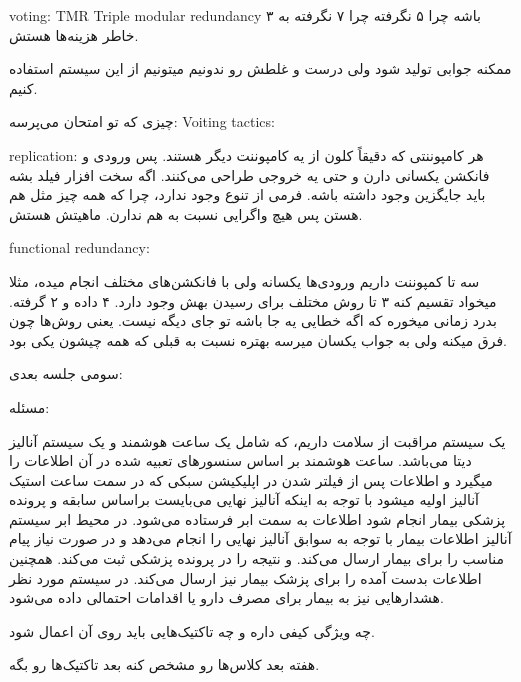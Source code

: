 voting: TMR Triple modular redundancy ۳ باشه چرا ۵ نگرفته چرا ۷ نگرفته به خاطر
هزینه‌ها هستش.

ممکنه جوابی تولید شود ولی درست و غلطش رو ندونیم میتونیم از این سیستم استفاده
کنیم. 

چیزی که تو امتحان می‌پرسه:
Voiting tactics:

replication: هر کامپوننتی که دقیقاً کلون از یه کامپوننت دیگر هستند. پس ورودی و
فانکشن یکسانی دارن و حتی یه خروجی طراحی می‌کنند. اگه سخت افزار فیلد بشه باید
جایگزین وجود داشته باشه. فرمی از تنوع وجود ندارد، چرا که همه چیز مثل هم هستن پس
هیچ واگرایی نسبت به هم ندارن. ماهیتش هستش.

functional redundancy:

سه تا کمپوننت داریم ورودی‌ها یکسانه ولی با فانکشن‌های مختلف انجام میده، مثلا
میخواد تقسیم کنه ۳ تا روش مختلف برای رسیدن بهش وجود دارد. ۴ داده و ۲ گرفته. بدرد
زمانی میخوره که اگه خطایی یه جا باشه تو جای دیگه نیست. یعنی روش‌ها چون فرق میکنه
ولی به جواب یکسان میرسه بهتره نسبت به قبلی که همه چیشون یکی بود.

سومی جلسه بعدی:

مسئله:

یک سیستم مراقبت از سلامت داریم، که شامل یک ساعت هوشمند و یک سیستم آنالیز دیتا
می‌باشد. ساعت هوشمند بر اساس سنسور‌های تعبیه شده در آن اطلاعات را میگیرد و
اطلاعات پس از فیلتر شدن در اپلیکیشن سبکی که در سمت ساعت استیک آنالیز اولیه میشود
با توجه به اینکه آنالیز نهایی می‌بایست براساس سابقه و پرونده پزشکی بیمار انجام
شود اطلاعات به سمت ابر فرستاده می‌شود. در محیط ابر سیستم آنالیز اطلاعات بیمار با
توجه به سوابق آنالیز نهایی را انجام می‌دهد و در صورت نیاز پیام مناسب را برای
بیمار ارسال می‌کند. و نتیجه را در پرونده پزشکی ثبت می‌کند. همچنین اطلاعات بدست
آمده را برای پزشک بیمار نیز ارسال می‌کند. در سیستم مورد نظر هشدار‌هایی نیز به
بیمار برای مصرف دارو یا اقدامات احتمالی داده می‌شود.

چه ویژگی کیفی داره و چه تاکتیک‌هایی باید روی آن اعمال شود.

هفته بعد کلاس‌ها رو مشخص کنه بعد تاکتیک‌ها رو بگه.